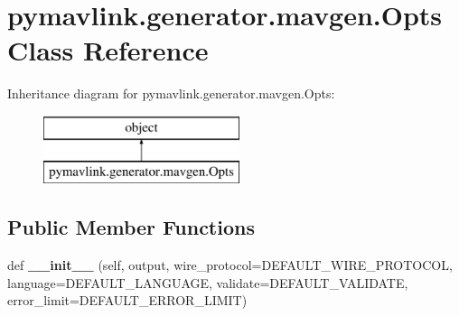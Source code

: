 \hypertarget{classpymavlink_1_1generator_1_1mavgen_1_1Opts}{}\section{pymavlink.\+generator.\+mavgen.\+Opts Class Reference}
\label{classpymavlink_1_1generator_1_1mavgen_1_1Opts}
Inheritance diagram for pymavlink.\+generator.\+mavgen.\+Opts\+:\begin{figure}[H]
\begin{center}
\leavevmode
\includegraphics[height=2.000000cm]{classpymavlink_1_1generator_1_1mavgen_1_1Opts}
\end{center}
\end{figure}
\subsection*{Public Member Functions}
\begin{DoxyCompactItemize}
\item 
\mbox{\label{classpymavlink_1_1generator_1_1mavgen_1_1Opts_aa7412201819bd28a4f9134900591d3a1}} 
def {\bfseries \+\_\+\+\_\+init\+\_\+\+\_\+} (self, output, wire\+\_\+protocol=D\+E\+F\+A\+U\+L\+T\+\_\+\+W\+I\+R\+E\+\_\+\+P\+R\+O\+T\+O\+C\+OL, language=D\+E\+F\+A\+U\+L\+T\+\_\+\+L\+A\+N\+G\+U\+A\+GE, validate=D\+E\+F\+A\+U\+L\+T\+\_\+\+V\+A\+L\+I\+D\+A\+TE, error\+\_\+limit=D\+E\+F\+A\+U\+L\+T\+\_\+\+E\+R\+R\+O\+R\+\_\+\+L\+I\+M\+IT)
\end{DoxyCompactItemize}
